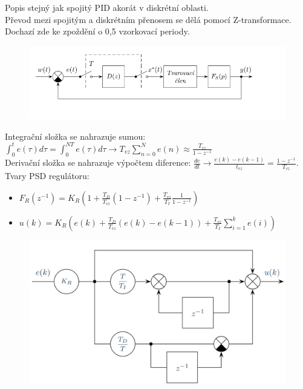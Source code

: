 Popis stejný jak spojitý PID akorát v diskrétní oblasti.\\
Převod mezi spojitým a diskrétním přenosem se dělá pomocí Z-transformace. Dochazí zde ke zpoždění o 0,5 vzorkovací periody.
\begin{figure}[H]
    \includegraphics*[scale = 1]{images/PSDVzorkovani.png}
\end{figure}
Integrační složka se nahrazuje sumou: \(\int_{0}^{t}e(\tau)d\tau = \int_{0}^{NT}e(\tau)d\tau \rightarrow T_{vz}\sum_{n = 0}^{N}e(n) \approx \frac{T_{vz}}{1-z ^{-1}} \)\\
Derivační složka se nahrazuje výpočtem diference: $\frac{de}{dt} \rightarrow \frac{e(k)-e(k-1)}{t_{vz}} = \frac{1-z^{-1}}{T_{vz}}$.\\
Tvary PSD regulátoru:
\begin{itemize}
    \item $F_R(z^{-1}) = K_R(1+\frac{T_D}{T_{vz}}(1-z^{-1})+\frac{T_{vz}}{T_I}\frac{1}{1-z^{-1}})$
    \item $u(k) = K_R(e(k)+\frac{T_D}{T_{vz}}(e(k)-e(k-1))+\frac{T_{vz}}{T_I}\sum^k_{i=1}e(i))$
\end{itemize}
\begin{figure}[H]
    \centering
    \includegraphics*[scale = 0.3]{images/PSD_regulator.png}
\end{figure}
\newpage

